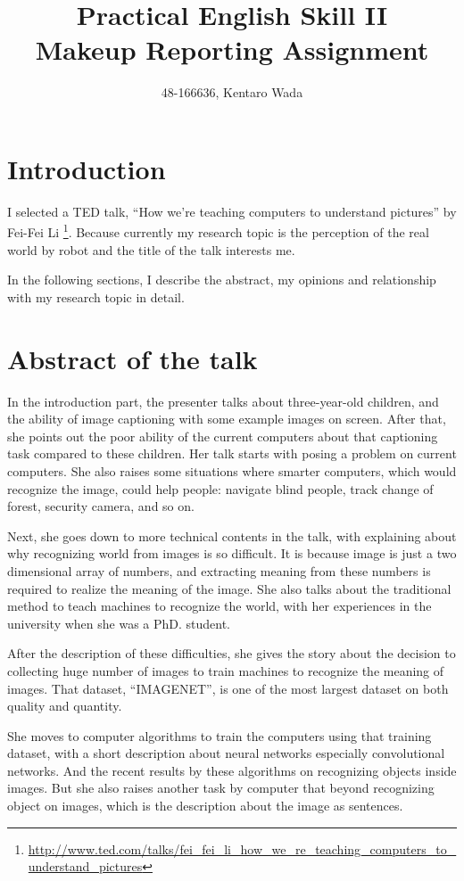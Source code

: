 \documentclass[letter, twocolumn]{ieeeconf}
\title{ {\small Practical English Skill II} \\ Makeup Reporting Assignment}
\author{48-166636, Kentaro Wada}
\begin{document}
\pagestyle{empty}
\maketitle
\thispagestyle{empty}
\sloppy

\section{Introduction}

I selected a TED talk, ``How we're teaching computers to understand pictures'' by Fei-Fei Li
\footnote{\url{http://www.ted.com/talks/fei_fei_li_how_we_re_teaching_computers_to_understand_pictures}}.
Because currently my research topic is the perception of the real world by robot
and the title of the talk interests me.

In the following sections,
I describe the abstract, my opinions and relationship with my research topic in detail.

\section{Abstract of the talk}

In the introduction part, the presenter talks about three-year-old children,
and the ability of image captioning with some example images on screen.
After that, she points out the poor ability of the current computers about that captioning task
compared to these children.
Her talk starts with posing a problem on current computers.
She also raises some situations where smarter computers, which would recognize the image,
could help people: navigate blind people, track change of forest, security camera, and so on.

Next, she goes down to more technical contents in the talk,
with explaining about why recognizing world from images is so difficult.
It is because image is just a two dimensional array of numbers,
and extracting meaning from these numbers is required to realize the meaning of the image.
She also talks about the traditional method to teach machines to recognize the world,
with her experiences in the university when she was a PhD. student.

After the description of these difficulties,
she gives the story about the decision to collecting huge number of images
to train machines to recognize the meaning of images.
That dataset, ``IMAGENET'', is one of the most largest dataset on both quality and quantity.

She moves to computer algorithms to train the computers using that training dataset,
with a short description about neural networks especially convolutional networks.
And the recent results by these algorithms on recognizing objects inside images.
But she also raises another task by computer that beyond recognizing object on images,
which is the description about the image as sentences.
\end{document}
